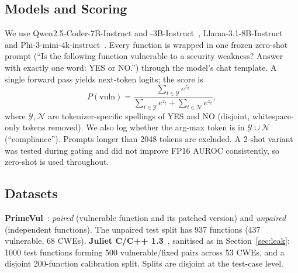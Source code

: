 \documentclass[conference]{IEEEtran}
\begin{document}
\subsection{Models and Scoring}
We use Qwen2.5-Coder-7B-Instruct and -3B-Instruct~\cite{hui2024qwen25coder}, Llama-3.1-8B-Instruct~\cite{dubey2024llama3} and Phi-3-mini-4k-instruct~\cite{abdin2024phi3}. Every function is wrapped in one frozen zero-shot prompt (``Is the following function vulnerable to a security weakness? Answer with exactly one word: YES or NO.'') through the model's chat template. A single forward pass yields next-token logits; the score is
\begin{equation}
P(\text{vuln}) = \frac{\sum_{t\in\mathcal{Y}} e^{z_t}}{\sum_{t\in\mathcal{Y}} e^{z_t} + \sum_{t\in\mathcal{N}} e^{z_t}},
\end{equation}
where $\mathcal{Y},\mathcal{N}$ are tokenizer-specific spellings of YES and NO (disjoint, whitespace-only tokens removed). We also log whether the arg-max token is in $\mathcal{Y}\cup\mathcal{N}$ (``compliance''). Prompts longer than 2048 tokens are excluded. A 2-shot variant was tested during gating and did not improve FP16 AUROC consistently, so zero-shot is used throughout.

\subsection{Datasets}
\textbf{PrimeVul}~\cite{ding2024primevul}: \emph{paired} (vulnerable function and its patched version) and \emph{unpaired} (independent functions). The unpaired test split has 937 functions (437 vulnerable, 68 CWEs).
\textbf{Juliet C/C++ 1.3}~\cite{boland2012juliet}, sanitised as in Section~\ref{sec:leak}: 1000 test functions forming 500 vulnerable/fixed pairs across 53 CWEs, and a disjoint 200-function calibration split. Splits are disjoint at the test-case level.
\end{document}
